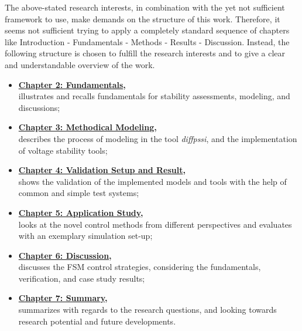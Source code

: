 The above-stated research interests, in combination with the yet not sufficient framework to use, make demands on the structure of this work. 
Therefore, it seems not sufficient trying to apply a completely standard sequence of chapters like \glqq Introduction - Fundamentals - Methods - Results - Discussion\grqq.
Instead, the following structure is chosen to fulfill the research interests and to give a clear and understandable overview of the work.
\begin{itemize}
    \item \textbf{\hyperref[chap:fundamentals]{Chapter 2: Fundamentals},}\\
    illustrates and recalls fundamentals for stability assessments, modeling, and discussions;
    \item \textbf{\hyperref[chap:methodical-modeling]{Chapter 3: Methodical Modeling},}\\
    describes the process of modeling in the tool \textit{diffpssi}, and the implementation of voltage stability tools;
    \item \textbf{\hyperref[chap:verification]{Chapter 4: Validation Setup and Result},}\\
    shows the validation of the implemented models and tools with the help of common and simple test systems;
    \item \textbf{\hyperref[chap:case-study]{Chapter 5: Application Study},}\\
    looks at the novel control methods from different perspectives and evaluates with an exemplary simulation set-up; 
    \item \textbf{\hyperref[chap:discussion]{Chapter 6: Discussion},}\\
    discusses the FSM control strategies, considering the fundamentals, verification, and case study results;
    \item \textbf{\hyperref[chap:summary]{Chapter 7: Summary},}\\
    summarizes with regards to the research questions, and looking towards research potential and future developments. 
\end{itemize}


